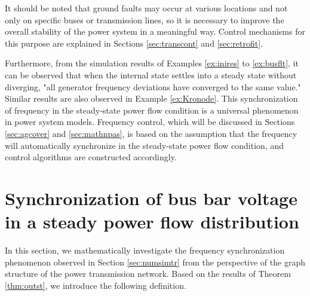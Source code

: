 \documentclass[graybox, envcountchap]{svmult}
\begin{document}
It should be noted that ground faults may occur at various locations and not
only on specific buses or transmission lines, so it is necessary to improve the
overall stability of the power system in a meaningful way. Control mechanisms
for this purpose are explained in Sections \ref{sec:transcont} and
\ref{sec:retrofit}.

Furthermore, from the simulation results of Examples \ref{ex:inires} to
\ref{ex:busflt}, it can be observed that when the internal state settles into a
steady state without diverging, "all generator frequency deviations have
converged to the same value." Similar results are also observed in Example
\ref{ex:Kronode}. This synchronization of frequency in the steady-state power
flow condition is a universal phenomenon in power system models. Frequency
control, which will be discussed in Sections \ref{sec:agcover} and
\ref{sec:mathnpas}, is based on the assumption that the frequency will
automatically synchronize in the steady-state power flow condition, and control
algorithms are constructed accordingly.

\section{Synchronization of bus bar voltage in a steady power flow distribution\advanced}\label{sec:phsync}

In this section, we mathematically investigate the frequency synchronization
phenomenon observed in Section \ref{sec:numsimtr} from the perspective of the
graph structure of the power transmission network. Based on the results of
Theorem \ref{thm:outst}, we introduce the following definition.
\end{document}
